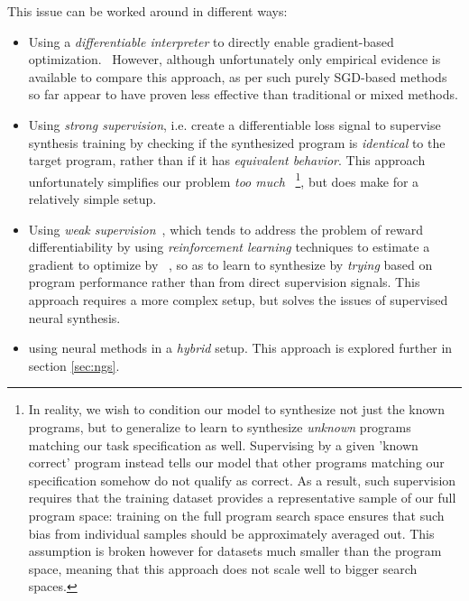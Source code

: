 \documentclass{article}
\begin{document}
This issue can be worked around in different ways:
\begin{itemize}
    \item Using a \emph{differentiable interpreter} to directly enable gradient-based optimization.~\citep{forth,terpret,houdini,feser2016differentiable,rocktaschel2017end,abadi2019simple}
        However, although unfortunately only empirical evidence is available to compare this approach, as per \citet{terpret} such purely SGD-based methods so far appear to have proven less effective than traditional or mixed methods.
    \item Using \emph{strong supervision}, i.e. create a differentiable loss signal
        to supervise synthesis training by checking if the synthesized program is \emph{identical} to the target program,
        rather than if it has \emph{equivalent behavior}.
        This approach unfortunately simplifies our problem \emph{too much}%
        ~\footnote{
            In reality, we wish to condition our model to synthesize not just the known programs,
            but to generalize to learn to synthesize \emph{unknown} programs matching our task specification as well.
            Supervising by a given 'known correct' program instead tells our model that other programs matching our specification somehow do not qualify as correct.
            As a result, such supervision requires that the training dataset provides a representative sample of our full program space:
            training on the full program search space ensures that such bias from individual samples should be approximately averaged out.
            This assumption is broken however for datasets much smaller than the program space,
            meaning that this approach does not scale well to bigger search spaces.
        }, but does make for a relatively simple setup.
    \item Using \emph{weak supervision}~\citep{mapo},
        which tends to address the problem of reward differentiability by using \emph{reinforcement learning} techniques to estimate a gradient to optimize by%
        ~\citep{chen2017towards,bunel2018leveraging,xu2019neural,camacho2019towards},
        so as to learn to synthesize by \emph{trying} based on program performance rather than from direct supervision signals.
        This approach requires a more complex setup, but solves the issues of supervised neural synthesis.
    \item using neural methods in a \emph{hybrid} setup. This approach is explored further in section \ref{sec:ngs}.
\end{itemize}
\end{document}
